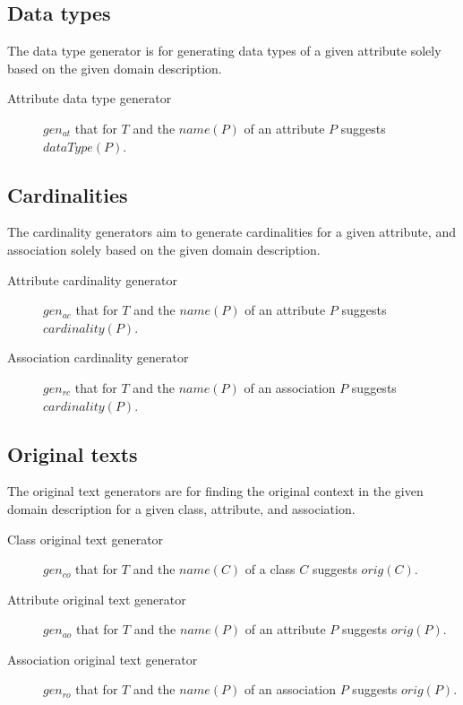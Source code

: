 \subsection{Data types}

The data type generator is for generating data types of a given attribute solely based on the given domain description.

\begin{description}
\item [Attribute data type generator] $gen_{at}$ that for $T$ and the $name(P)$ of an attribute $P$ suggests $dataType(P)$.
\end{description}


\subsection{Cardinalities}

The cardinality generators aim to generate cardinalities for a given attribute, and association solely based on the given domain description.

\begin{description}
\item [Attribute cardinality generator] $gen_{ac}$ that for $T$ and the $name(P)$ of an attribute $P$ suggests $cardinality(P)$.

\item [Association cardinality generator] $gen_{rc}$ that for $T$ and the $name(P)$ of an association $P$ suggests $cardinality(P)$.
\end{description}


\subsection{Original texts}

The original text generators are for finding the original context in the given domain description for a given class, attribute, and association.

\begin{description}
\item [Class original text generator] $gen_{co}$ that for $T$ and the $name(C)$ of a class $C$ suggests $orig(C)$.

\item [Attribute original text generator] $gen_{ao}$ that for $T$ and the $name(P)$ of an attribute $P$ suggests $orig(P)$.

\item [Association original text generator] $gen_{ro}$ that for $T$ and the $name(P)$ of an association $P$ suggests $orig(P)$.
\end{description}


